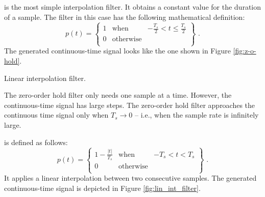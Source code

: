  is the most simple interpolation filter. It obtains a constant value for the duration of a sample. The filter in this case has the following mathematical definition:
\begin{equation}
p(t) = \left\{
  \begin{array}{rcr}
    1 & \mathrm{when} & -\frac{T_s}{2} < t \le \frac{T_s}{2} \\
    0 & \mathrm{otherwise} & \\
  \end{array}
\right\} \,\,.
\end{equation}
The generated continuous-time signal looks like the one shown in Figure \ref{fig:z-o-hold}.

\begin{marginfigure}
\begin{center}
\end{center}
\caption{Linear interpolation filter.}
\label{fig:lin_int_filter}
\end{marginfigure}

The zero-order hold filter only needs one sample at a time. However, the continuous-time signal has large steps. The zero-order hold filter approaches the continuous time signal only when $T_s\rightarrow 0$ -- i.e., when the sample rate is infinitely large.

 is defined as follows:
\begin{equation}
p(t) = \left\{
  \begin{array}{rcr}
    1-\frac{|t|}{T_s} & \mathrm{when} & -T_s < t < T_s \\
    0 & \mathrm{otherwise} & \\
  \end{array}
\right\} \,\,.
\end{equation}
It applies a linear interpolation between two consecutive samples. The generated continuous-time signal is depicted in Figure \ref{fig:lin_int_filter}.

